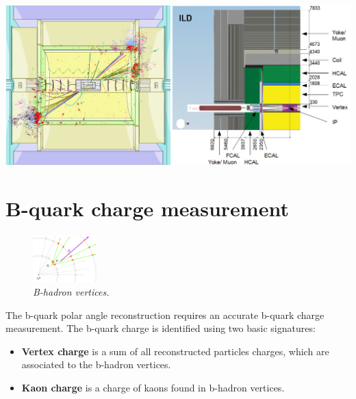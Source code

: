 \begin{center}\vspace{1.8cm}
	\centering
	
	\includegraphics[width=0.9\linewidth]{figures/ild3.png}
	\label{fig:ILDScheme}
\end{center}\vspace{1cm}

\color{DarkSlateGray} %

\section*{B-quark charge measurement}
\setlength{\columnsep}{20pt}%
\begin{figure}
	
	\includegraphics[width=0.22\textwidth]{figures/vtx.pdf}
	\caption{\sl B-hadron vertices.}
	\label{fig:vtx}

\end{figure}

\color{Blue}
The b-quark polar angle reconstruction requires an accurate b-quark charge measurement. 
The b-quark charge is identified using two basic signatures:
\begin{itemize}
	\item \textbf{Vertex charge} is a sum of all reconstructed particles charges, which are associated to the b-hadron vertices. 
	\item \textbf{Kaon charge} is a charge of kaons found in b-hadron vertices. 
\end{itemize}

